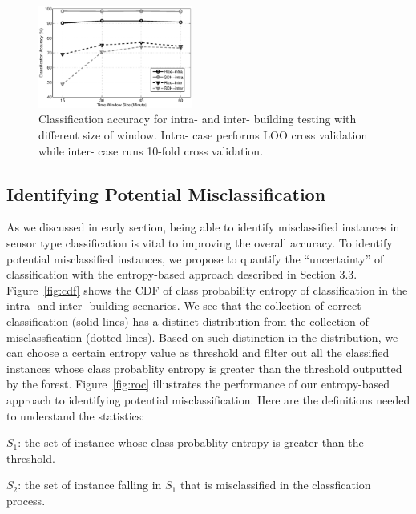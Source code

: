 \begin{figure}[h!]
\centering
	\includegraphics[width=0.45\textwidth]{./fig/window.eps}
\caption{Classification accuracy for intra- and inter- building testing with different size of window. Intra- case performs LOO cross validation while inter- case runs 10-fold cross validation.}
\label{fig:window}
\end{figure}

\subsection{Identifying Potential Misclassification}
As we discussed in early section, being able to identify misclassified instances in sensor type classification is vital to improving the overall accuracy. To identify potential misclassified instances, we propose to quantify the ``uncertainty'' of classification with the entropy-based approach described in Section 3.3. Figure~\ref{fig:cdf} shows the CDF of class probability entropy of classification in the intra- and inter- building scenarios. We see that the collection of correct
classification (solid lines) has a distinct distribution from the collection of misclassfication (dotted lines). Based on such distinction in the distribution, we can choose a certain entropy value as threshold and filter out all the classified instances whose class probablity entropy is greater than the threshold outputted by the forest. Figure~\ref{fig:roc} illustrates the performance of our entropy-based approach to identifying potential misclassification. Here are the definitions needed to understand the statistics:

$S_{1}$: the set of instance whose class probablity entropy is greater than the threshold.

$S_{2}$: the set of instance falling in $S_{1}$ that is misclassified in the classfication process.

